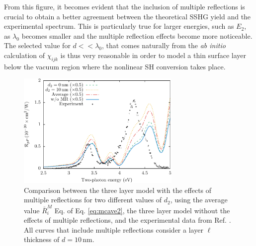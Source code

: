 From this figure, it becomes evident that the inclusion of multiple reflections is crucial to obtain a better agreement between the theoretical SSHG yield and the experimental spectrum. This is particularly true for larger energies, such as $E_{2}$, as $\lambda_{0}$ becomes smaller and the multiple reflection effects become more noticeable. The selected value for $d << \lambda_{0}$, that comes naturally from the \emph{ab initio} calculation of $\chi_{ijk}$ is thus very reasonable in order to model a thin surface layer below the vacuum region where the nonlinear SH conversion takes place.

\begin{figure}
\centering
\includegraphics[width=0.7\textwidth]{content/figures/fig-4_4_14}
\caption{Comparison between the three layer model with the effects of multiple reflections for two different values of $d_{2}$, using the average value $\bar{R}^{M}_{i}$ Eq. of Eq. \eqref{eq:mcave2}, the three layer model without the effects of multiple reflections, and the experimental data from Ref. \cite{mejiaPRB02}. All curves that include multiple reflections consider a layer $\ell$ thickness of $d = 10\,\mathrm{nm}$.}
\label{fig:d2values}
\end{figure}
